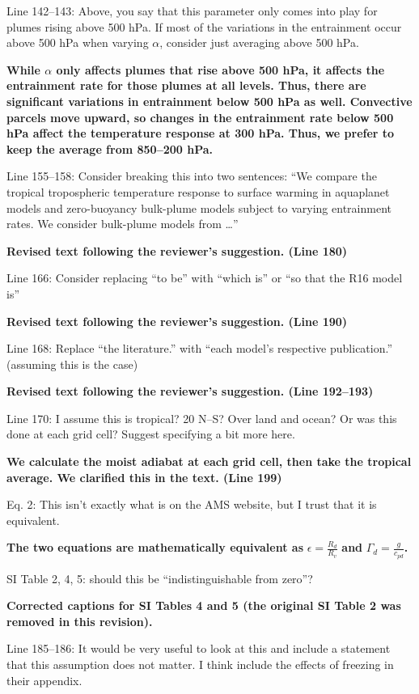\documentclass[11pt]{article}
\begin{document}
Line 142--143: Above, you say that this parameter only comes into play for plumes rising above 500 hPa. If most of the variations in the entrainment occur above 500 hPa when varying \(\alpha\), consider just averaging above 500 hPa.

\textbf{While $\alpha$ only affects plumes that rise above 500 hPa, it affects the entrainment rate for those plumes at all levels. Thus, there are significant variations in entrainment below 500 hPa as well. Convective parcels move upward, so changes in the entrainment rate below 500 hPa affect the temperature response at 300 hPa. Thus, we prefer to keep the average from 850--200 hPa.}

Line 155--158: Consider breaking this into two sentences: ``We compare the tropical tropospheric temperature response to surface warming in aquaplanet models and zero-buoyancy bulk-plume models subject to varying entrainment rates. We consider bulk-plume models from \ldots{}''

\textbf{Revised text following the reviewer's suggestion. (Line 180)}

Line 166: Consider replacing ``to be'' with ``which is'' or ``so that the R16 model is''

\textbf{Revised text following the reviewer's suggestion. (Line 190)}

Line 168: Replace ``the literature.'' with ``each model's respective publication.'' (assuming this is the case)

\textbf{Revised text following the reviewer's suggestion. (Line 192--193)}

Line 170: I assume this is tropical? 20 N--S? Over land and ocean? Or was this done at each grid cell? Suggest specifying a bit more here.

\textbf{We calculate the moist adiabat at each grid cell, then take the tropical average. We clarified this in the text. (Line 199)}

Eq. 2: This isn't exactly what is on the AMS website, but I trust that it is equivalent.

\textbf{The two equations are mathematically equivalent as} \(\epsilon=\frac{R_d}{R_v}\) \textbf{and} \(\Gamma_d=\frac{g}{c_{pd}}\)\textbf{.}

SI Table 2, 4, 5: should this be ``indistinguishable from zero''?

\textbf{Corrected captions for SI Tables 4 and 5 (the original SI Table 2 was removed in this revision).}

Line 185--186: It would be very useful to look at this and include a statement that this assumption does not matter. I think \cite{flannaghan_tropical_2014} include the effects of freezing in their appendix.
\end{document}
